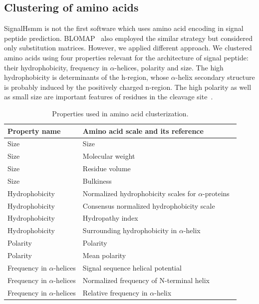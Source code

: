 \documentclass[fleqn,10pt,twoside]{gcb15submission}
\begin{document}
\subsection*{Clustering of amino acids}

SignalHsmm is not the first software which uses amino acid encoding in signal peptide prediction. BLOMAP~\citep{maetschke2005blomap} also employed the similar strategy but considered only substitution matrices. However, we applied different approach. We clustered amino acids using four properties relevant for the architecture of signal peptide: their hydrophobicity, frequency in $\alpha$-helices, polarity and size. The high hydrophobicity is determinants of the h-region, whose $\alpha$-helix secondary structure is probably induced by the positively charged n-region. The high polarity as well as small size are important features of residues in the cleavage site~\citep{1994palzkillselection}.

\begin{table}[ht]
\small
\centering
\caption{Properties used in amino acid clusterization.} 
\begin{tabular}{ll}
  \toprule
Property name & Amino acid scale and its reference \\ 
  \midrule
Size & Size~\citep{dawson1972size} \\ 
   \rowcolor[gray]{0.85}Size & Molecular weight~\citep{fasman1976handbook}\\ 
  Size & Residue volume~\citep{1973goldsackcontribution} \\ 
   \rowcolor[gray]{0.85}Size & Bulkiness~\citep{1968zimmermanthe} \\ 
  Hydrophobicity & Normalized hydrophobicity scales for $\alpha$-proteins~\citep{1992cidhydrophobicity} \\ 
   \rowcolor[gray]{0.85}Hydrophobicity & Consensus normalized hydrophobicity scale~\citep{1984eisenbergthreedimensional} \\ 
  Hydrophobicity & Hydropathy index~\citep{1982kytea} \\ 
   \rowcolor[gray]{0.85}Hydrophobicity & Surrounding hydrophobicity in $\alpha$-helix~\citep{1980ponnuswamyhydrophobic} \\ 
  Polarity & Polarity~\citep{1974granthamamino} \\ 
   \rowcolor[gray]{0.85}Polarity & Mean polarity~\citep{1988radzickainfluences} \\ 
  Frequency in $\alpha$-helices & Signal sequence helical potential~\citep{1982argosstructural} \\ 
   \rowcolor[gray]{0.85}Frequency in $\alpha$-helices & Normalized frequency of N-terminal helix~\citep{chou1978prediction} \\ 
  Frequency in $\alpha$-helices & Relative frequency in $\alpha$-helix~\citep{1990prabhakaranthe} \\ 
   \bottomrule
\end{tabular}
\label{tab:aaprop}
\end{table}
\end{document}
